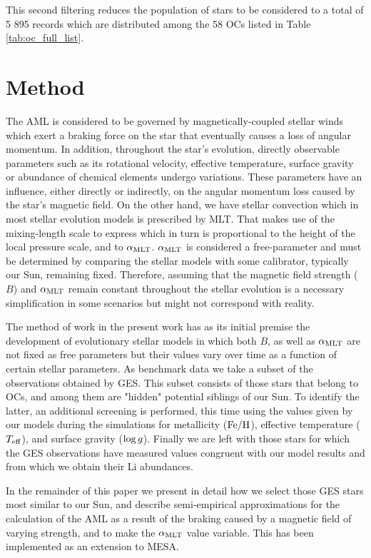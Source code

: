 \documentclass[fleqn,usenatbib]{mnras}
\begin{document}
This second filtering reduces the population of stars to be considered to a total of 5 895 records which are distributed among the 58 OCs listed in Table \ref{tab:oc_full_list}.\par


\section{Method} \label{sec_method}
The AML is considered to be governed by magnetically-coupled stellar winds which exert a braking force on the star that eventually causes a loss of angular momentum. In addition, throughout the star's evolution, directly observable parameters such as its rotational velocity, effective temperature, surface gravity or abundance of chemical elements undergo variations. These parameters have an influence, either directly or indirectly, on the angular momentum loss caused by the star's magnetic field. On the other hand, we have stellar convection which in most stellar evolution models is prescribed by MLT. That makes use of the mixing-length scale to express which in turn is proportional to the height of the local pressure scale, and to $\alpha_{\mathrm{MLT}}$. $\alpha_{\mathrm{MLT}}$ is considered a free-parameter and must be determined by comparing the stellar models with some calibrator, typically our Sun, remaining fixed. Therefore, assuming that the magnetic field strength ($B$) and $\alpha_{\mathrm{MLT}}$ remain constant throughout the stellar evolution is a necessary simplification in some scenarios but might not correspond with reality.\par

The method of work in the present work has as its initial premise the development of evolutionary stellar models in which both $B$, as well as $\alpha_{\mathrm{MLT}}$ are not fixed as free parameters but their values vary over time as a function of certain stellar parameters. As benchmark data we take a subset of the observations obtained by GES. This subset consists of those stars that belong to OCs, and among them are "hidden" potential siblings of our Sun. To identify the latter, an additional screening is performed, this time using the values given by our models during the simulations for metallicity ($\mathrm{Fe}/\mathrm{H}$), effective temperature ($T_{\mathrm{eff}}$), and surface gravity ($\mathrm{log} \, g$). Finally we are left with those stars for which the GES observations have measured values congruent with our model results and from which we obtain their Li abundances.\par

In the remainder of this paper we present in detail how we select those GES stars most similar to our Sun, and describe semi-empirical approximations for the calculation of the AML as a result of the braking caused by a magnetic field of varying strength, and to make the $\alpha_{\mathrm{MLT}}$ value variable. This has been implemented as an extension to MESA.\par
\end{document}
